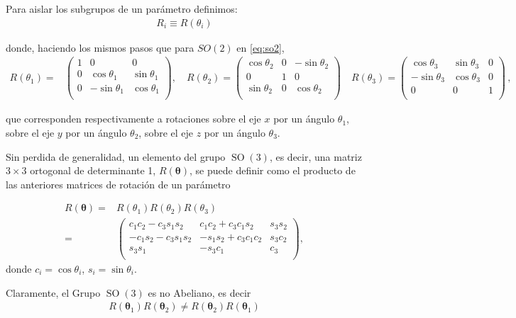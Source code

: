 Para aislar los subgrupos de un parámetro definimos:
\begin{align}
  R_i\equiv R(\theta_i)
\end{align}
\begin{frame}
donde, haciendo los mismos pasos que para $SO(2)$ en \eqref{eq:so2},
\begin{align}
  \label{eq:lirot}
  R(\theta_1)=&
  \begin{pmatrix}
   1 &   0        &0\\
   0 &\cos\theta_1  & \sin\theta_1\\
   0 & -\sin\theta_1& \cos\theta_1\\
  \end{pmatrix},\quad R(\theta_2)=
  \begin{pmatrix}
     \cos\theta_2 &0& -\sin\theta_2\\
     0          &1& 0          \\
    \sin\theta_2  &0&  \cos\theta_2\\
  \end{pmatrix}\quad R(\theta_3)=
  \begin{pmatrix}
     \cos\theta_3 & \sin\theta_3&0\\
     -\sin\theta_3& \cos\theta_3&0\\
      0         &     0     &1\\
  \end{pmatrix}\,,
\end{align}
\end{frame}
que corresponden respectivamente a rotaciones sobre el eje $x$ por un ángulo $\theta_1$, sobre el eje $y$ por un ángulo $\theta_2$, sobre el eje $z$ por un ángulo $\theta_3$.

Sin perdida de generalidad, un elemento del grupo $\operatorname{SO}(3)$, es decir, una matriz $3\times3$ ortogonal de determinante 1, $R(\boldsymbol{\theta})$, se puede definir como el producto de las anteriores matrices de rotación de un parámetro
\begin{frame}
\begin{align}
 R(\boldsymbol{\theta}) =&R(\theta_1)R(\theta_2)R(\theta_3) \nonumber\\
=&
  \begin{pmatrix}
    c_1 c_2-c_3 s_1 s_2    & c_1 c_2 + c_3 c_1 s_2  & s_3 s_2 \\
    -c_1 s_2 - c_3 s_1 s_2 & -s_1 s_2 + c_3 c_1 c_2 & s_3 c_2 \\
    s_3 s_1               & -s_3 c_1               & c_3\\
  \end{pmatrix},
\end{align}
donde $c_i=\cos \theta_i$,  $s_i=\sin \theta_i$.


Claramente, el Grupo $\operatorname{SO}(3)$ es no Abeliano, es decir
\begin{align*}
  R(\boldsymbol{\theta}_1)R(\boldsymbol{\theta}_2)\ne R(\boldsymbol{\theta}_2)R(\boldsymbol{\theta}_1)
\end{align*}
\end{frame}

